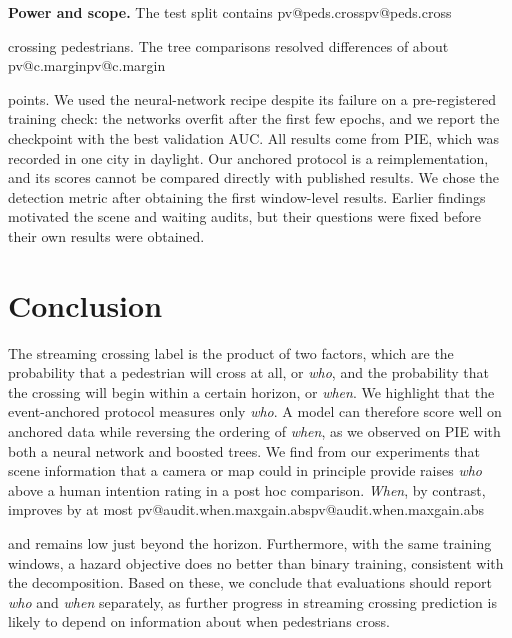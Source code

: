 \documentclass[10pt,a4paper,twocolumn]{article}
\makeatletter
\newcommand{\V}[1]{\ifcsname pv@#1\endcsname\csname pv@#1\endcsname\else
  \PackageError{numbers}{Unknown number key: #1}{Run figures/make_tables.py}\fi}
\makeatother
\begin{document}
\textbf{Power and scope.} The test split contains \V{peds.cross} crossing
pedestrians. The tree comparisons resolved differences of about \V{c.margin} points.
We used the neural-network recipe despite its failure on a pre-registered
training check: the networks overfit after the first few epochs, and we
report the checkpoint with the best validation AUC. All results come from PIE,
which was recorded in one city in daylight. Our anchored protocol is a
reimplementation, and its scores cannot be compared directly with published
results. We chose the detection metric after obtaining the first window-level
results. Earlier findings motivated the scene and waiting audits, but their
questions were fixed before their own results were obtained.

\section{Conclusion}
\label{sec:conclusion}
The streaming crossing label is the product of two factors, which are the
probability that a pedestrian will cross at all, or \emph{who}, and the
probability that the crossing will begin within a certain horizon, or
\emph{when}. We highlight that the event-anchored protocol measures only
\emph{who}. A model can therefore score well on anchored data while reversing
the ordering of \emph{when}, as we observed on PIE with both a neural network
and boosted trees. We find from our experiments that scene information that a
camera or map could in principle provide raises \emph{who} above a human
intention rating in a post hoc comparison. \emph{When}, by contrast, improves
by at most \V{audit.when.maxgain.abs} and remains low just beyond the horizon.
Furthermore, with the same training windows, a hazard objective does no better
than binary training, consistent with the decomposition. Based on these, we
conclude that evaluations should report \emph{who} and \emph{when} separately,
as further progress in streaming crossing prediction is likely to depend on
information about when pedestrians cross.


\end{document}
